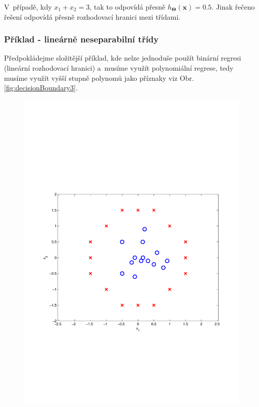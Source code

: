 \par{V~případě, kdy $x_1 + x_2 = 3$, tak to odpovídá přesně $h_{\bm{\Theta}} \left( \bm{x} \right) = 0.5$. Jinak řečeno řešení odpovídá přesně rozhodovací hranici mezi třídami.}

\newpage

\subsubsection*{Příklad - lineárně neseparabilní třídy}
\par{Předpokládejme složitější příklad, kde nelze jednoduše použít binární regresi (lineární rozhodovací hranici) a~musíme využít polynomiální regrese, tedy musíme využít vyšší stupně polynomů jako příznaky viz Obr. \ref{fig:decisionBoundary3}.}
\begin{figure}[!ht]
	\centering
	\begin{minipage}[t]{0.48\textwidth}
		\includegraphics[width = \textwidth, trim = 2.5cm 7cm 2cm 9cm]{./Img/BinarniRegrese/decisionBoundary/decisionBoundary3.pdf}

\end{minipage}
\end{figure}
